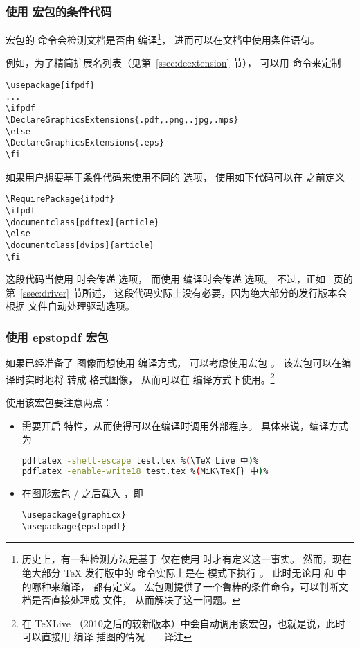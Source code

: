\subsubsection{使用  宏包的条件代码}
 宏包的  命令会检测文档是否由  编译\footnote{
	历史上，有一种检测方法是基于  仅在使用 \pdfLaTeX{} 时才有定义这一事实。
	然而，现在绝大部分 \TeX{} 发行版中的  命令实际上是在  模式下执行 \pdfLaTeX{}。
	此时无论用 和  中的哪种来编译， 都有定义。
	 宏包则提供了一个鲁棒的条件命令，可以判断文档是否直接处理成  文件，
	从而解决了这一问题。}，
进而可以在文档中使用条件语句。

例如，为了精简扩展名列表（见第~\ref{ssec:deextension} 节），
可以用  命令来定制
\begin{lstlisting}
\usepackage{ifpdf}
...
\ifpdf
\DeclareGraphicsExtensions{.pdf,.png,.jpg,.mps}
\else
\DeclareGraphicsExtensions{.eps}
\fi
\end{lstlisting}

如果用户想要基于条件代码来使用不同的  选项，
使用如下代码可以在  之前定义 
\begin{lstlisting}
\RequirePackage{ifpdf}
\ifpdf
\documentclass[pdftex]{article}
\else
\documentclass[dvips]{article}
\fi
\end{lstlisting}
这段代码当使用  时会传递  选项，
而使用  编译时会传递  选项。
不过，正如~\pageref{ssec:driver} 页的第~\ref{ssec:driver} 节所述，
这段代码实际上没有必要，因为绝大部分的发行版本会根据  文件自动处理驱动选项。

\subsubsection{使用 epstopdf 宏包}\label{sssec:epstopdf}
如果已经准备了  图像而想使用  编译方式，
可以考虑使用宏包 。
该宏包可以在编译时实时地将  转成  格式图像，
从而可以在  编译方式下使用。\footnote{
    在 \TeX Live （2010之后的较新版本）中会自动调用该宏包，也就是说，此时可以直接用  编译  插图的情况——译注}

使用该宏包要注意两点：
\begin{itemize}
	\item 需要开启  特性，从而使得可以在编译时调用外部程序。
	具体来说，编译方式为
\begin{lstlisting}[language=bash,escapechar=\%]
pdflatex -shell-escape test.tex %(\TeX Live 中)%
pdflatex -enable-write18 test.tex %(MiK\TeX{} 中)%
\end{lstlisting}
	\item 在图形宏包 / 之后载入 ，即
\begin{lstlisting}
\usepackage{graphicx}
\usepackage{epstopdf}
\end{lstlisting}
\end{itemize}

